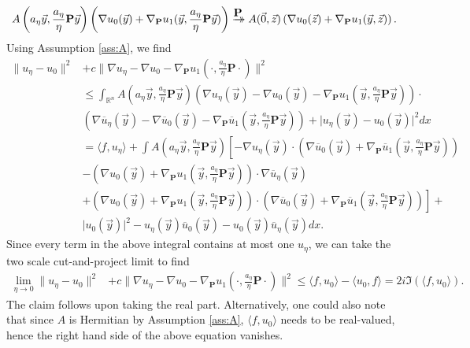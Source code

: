 \documentclass[a4paper,reqno]{amsart}
\numberwithin{equation}{section}
\numberwithin{equation}{section}		%
\numberwithin{figure}{section}			%
\numberwithin{table}{section}				%
\newcommand{\R}{\mathbb{R}}
\theoremstyle{definition}
\newcommand{\<}{\ensuremath \leq}
\renewcommand{\>}{\ensuremath \geq}
\def\dto{\buildrel\hbox{$\textbf{P}$}\over
\to \!\!\!\!\! \to}
\begin{document}
\begin{equation}
    A\left( a_\eta\vec{y}, \frac{a_\eta}{\eta}\textbf{P}\vec{y} \right)\left(\nabla u_0(\vec{y}) + \nabla_\textbf{P}u_1(\vec{y}, \frac{a_\eta}{\eta}\textbf{P}\vec{y})\right)\dto A(\vec 0,\vec{z  })\left(\nabla u_0(\vec{z}) + \nabla_{\mathbf{P}}u_1(\vec{y},\vec {z})\right).
\end{equation}
Using Assumption \ref{ass:A}, we find
\begin{equation}
    \begin{aligned}
        \lVert u_\eta-u_0\rVert^2 &+ c\lVert \nabla u_\eta - \nabla u_0 -\nabla_\textbf{P}u_1(\cdot,\frac{a_\eta}{\eta}\textbf{P}\cdot)\rVert^2\\
        &\leq \int_{\R^n} A\left( a_\eta\vec{y}, \frac{a_\eta}{\eta}\textbf{P}\vec{y} \right)\left(\nabla u_\eta(\vec{y}) -\nabla u_0(\vec{y}) - \nabla_\textbf{P}u_1(\vec{y}, \frac{a_\eta}{\eta}\textbf{P}\vec{y})\right)\cdot \\ 
        &\left(\nabla \overline{u}_\eta(\vec{y}) -\nabla \overline{u}_0(\vec{y}) - \nabla_\textbf{P}\overline{u}_1(\vec{y}, \frac{a_\eta}    {\eta}\textbf{P}\vec{y})\right) + \lvert u_\eta(\vec{y})- u_0(\vec{y})\rvert^2 dx\\
        &=\langle f,u_\eta\rangle + \int A\left( a_\eta\vec{y}, \frac{a_\eta}{\eta}\textbf{P}\vec{y} \right)\left[-\nabla u_\eta(\vec{y})\cdot\left(\nabla \overline{u}_0(\vec{y})
        + \nabla_\textbf{P}\overline{u}_1(\vec{y}, \frac{a_\eta}{\eta}\textbf{P}\vec{y})\right)\right.\\
        &\left.- \left(\nabla {u}_0(\vec{y}) +\nabla_\textbf{P}{u}_1(\vec{y}, \frac{a_\eta}    {\eta}\textbf{P}\vec{y})\right)\cdot \nabla\overline{u}_\eta(\vec{y})\right.\\
        &\left.+ \left(\nabla {u}_0(\vec{y}) + \nabla_\textbf{P}{u}_1(\vec{y}, \frac{a_\eta}    {\eta}\textbf{P}\vec{y})\right)\cdot \left(\nabla \overline{u}_0(\vec{y}) + \nabla_\textbf{P}\overline{u}_1(\vec{y}, \frac{a_\eta}    {\eta}\textbf{P}\vec{y})\right)\right] + \\
        & \lvert u_0(\vec{y})\rvert^2 - u_\eta(\vec{y})\overline{u}_0(\vec{y}) - u_0(\vec{y})\overline{u}_\eta(\vec{y})dx.
    \end{aligned}
\end{equation}
Since every term in the above integral contains at most one $u_\eta$, we can take the two scale cut-and-project limit to find
\begin{equation}
    \begin{aligned}
        \lim_{\eta\rightarrow0} \lVert u_\eta-u_0\rVert^2 &+ c\lVert \nabla u_\eta - \nabla u_0 -\nabla_\textbf{P}u_1(\cdot,\frac{a_\eta}{\eta}\textbf{P}\cdot)\rVert^2\leq \langle f,u_0\rangle -\langle u_0,f\rangle =2i\Im(\langle f,u_0\rangle).
    \end{aligned}
\end{equation}
The claim follows upon taking the real part. Alternatively, one could also note that since $A$ is Hermitian by Assumption \ref{ass:A}, $\langle f,u_0\rangle$ needs to be real-valued, hence the right hand side of the above equation vanishes.
\end{document}

